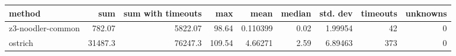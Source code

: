 \begin{tabular}{lrrrrrrrr}
\hline
 method            &      sum &   sum with timeouts &    max &     mean &   median &   std. dev &   timeouts &   unknowns \\
\hline
 z3-noodler-common &   782.07 &             5822.07 &  98.64 & 0.110399 &     0.02 &    1.99954 &         42 &          0 \\
 ostrich           & 31487.3  &            76247.3  & 109.54 & 4.66271  &     2.59 &    6.89463 &        373 &          0 \\
\hline
\end{tabular}
